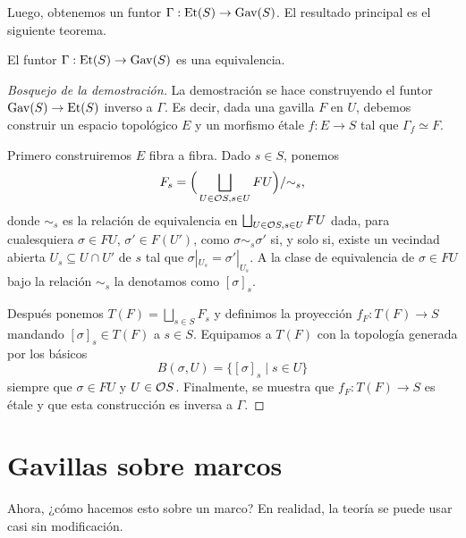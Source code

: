 Luego, obtenemos un funtor $\Gamma:\Et(S)\to\Gav(S)$.
El resultado principal es el siguiente teorema.

\begin{thm}
    El funtor $\Gamma:\Et(S)\to\Gav(S)$ es una equivalencia.
\end{thm}
\begin{proof}[Bosquejo de la demostración]
    La demostración se hace construyendo el funtor
    $\Gav(S)\to\Et(S)$ inverso a $\Gamma$.
    Es decir, dada una gavilla $F$ en $U$,
    debemos construir un espacio topológico $E$ y un morfismo
    étale $f:E\to S$ tal que $\Gamma_f\simeq F$.
    
    Primero construiremos $E$ fibra a fibra.
    Dado $s\in S$, ponemos
    \[
        F_s = \Big(\bigsqcup_{U\in\cal OS,s\in U} FU\Big)/\simr_s
    ,\]
    donde $\sim_s$ es la relación de equivalencia en
    $\bigsqcup_{U\in\cal OS,s\in U}FU$ dada,
    para cualesquiera $\sigma\in FU$, $\sigma'\in F(U')$, como
    $\sigma\sim_s\sigma'$ si, y solo si, existe un vecindad abierta
    $U_s\subseteq U\cap U'$ de $s$
    tal que $\sigma|_{U_s}=\sigma'|_{U_s}$.
    A la clase de equivalencia de $\sigma\in FU$ bajo la relación
    $\sim_s$ la denotamos como $[\sigma]_s$.
    
    Después ponemos $T(F)=\bigsqcup_{s\in S}F_s$
    y definimos la proyección $f_F:T(F)\to S$
    mandando $[\sigma]_s\in T(F)$ a $s\in S$.
    Equipamos a $T(F)$ con la topología generada por los básicos
    \[
        B(\sigma,U) = \{[\sigma]_s\mid s\in U\}
    \]
    siempre que $\sigma\in FU$ y $U\in\cal OS$.
    Finalmente, se muestra que $f_F:T(F)\to S$ es étale
    y que esta construcción es inversa a $\Gamma$.
\end{proof}

\section{Gavillas sobre marcos}
Ahora, ¿cómo hacemos esto sobre un marco?
En realidad, la teoría se puede usar casi sin modificación.

